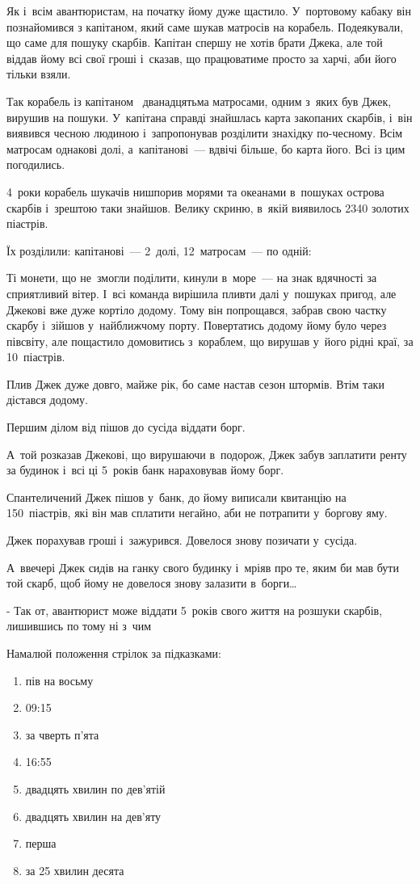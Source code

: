 Як і~всім авантюристам, на початку йому дуже щастило.
У~портовому кабаку він познайомився з капітаном, який саме шукав
матросів на корабель. Подеякували, що саме для пошуку скарбів.
Капітан спершу не хотів брати Джека, але той віддав йому всі свої
гроші і~сказав, що працюватиме просто за харчі, аби його тільки взяли.

Так корабель із капітаном  дванадцятьма матросами, одним з~яких був Джек,
вирушив на пошуки. У~капітана справді знайшлась карта закопаних скарбів,
і~він виявився чесною людиною і~запропонував розділити знахідку по-чесному.
Всім матросам однакові долі, а~капітанові~--- вдвічі більше, бо карта його.
Всі із цим погодились.

4~роки корабель шукачів нишпорив морями та океанами в~пошуках острова
скарбів і~зрештою таки знайшов. Велику скриню, в~якій виявилось
2340 золотих піастрів.

Їх розділили: капітанові~--- 2~долі, 12~матросам~--- по одній:

Ті монети, що не~змогли поділити, кинули в~море~--- на знак вдячності
за сприятливий вітер. І~всі команда вирішила пливти далі у~пошуках пригод,
але Джекові вже дуже кортіло додому. Тому він попрощався, забрав свою
частку скарбу і~зійшов у~найближчому порту. Повертатись додому йому було
через півсвіту, але пощастило домовитись з~кораблем, що вирушав у~його
рідні краї, за 10~піастрів.

Плив Джек дуже довго, майже рік, бо саме настав сезон штормів.
Втім таки дістався додому.

Першим ділом від пішов до сусіда віддати борг.

А~той розказав Джекові, що вирушаючи в~подорож, Джек забув заплатити
ренту за будинок і~всі ці 5~років банк нараховував йому борг.

Спантеличений Джек пішов у~банк, до йому виписали квитанцію на 150~піастрів,
які він мав сплатити негайно, аби не потрапити у~боргову яму.

Джек порахував гроші і~зажурився. Довелося знову позичати у~сусіда.

А~ввечері Джек сидів на ганку свого будинку і~мріяв про те,
яким би мав бути той скарб, щоб йому не довелося знову залазити в~борги\ldots

- Так от, авантюрист може віддати 5~років свого життя на розшуки скарбів,
лишившись по тому ні з~чим \smiley


\problem
Намалюй положення стрілок за підказками:
\begin{enumerate}
    \item пів на восьму
    \item 09:15
    \item за чверть п’ята
    \item 16:55
    \item двадцять хвилин по дев’ятій
    \item двадцять хвилин на дев’яту
    \item перша
    \item за 25 хвилин десята
\end{enumerate}


